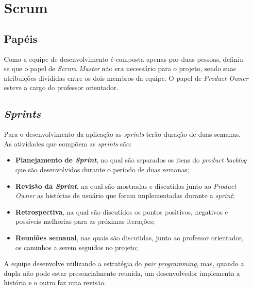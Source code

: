 \section{Scrum}

\subsection{Papéis}
Como a equipe de desenvolvimento é composta apenas por duas pessoas, definiu-se que o papel de \textit{Scrum Master} não era necessário para o projeto, sendo suas atribuições divididas entre os dois membros da equipe. O papel de \textit{Product Owner} esteve a cargo do professor orientador.

\subsection{\textit{Sprints}}
Para o desenvolvimento da aplicação as \textit{sprints} terão duração de duas semanas. As atividades que compõem as \textit{sprints} são:
\begin{itemize}
  \item \textbf{Planejamento de \textit{Sprint}}, no qual são separados os itens do \textit{product backlog} que são desenvolvidos durante o período de duas semanas;
  \item \textbf{Revisão da \textit{Sprint}}, na qual são mostradas e discutidas junto ao \textit{Product Owner} as histórias de usuário que foram implementadas durante a \textit{sprint};
  \item \textbf{Retrospectiva}, na qual são discutidos os pontos positivos, negativos e possíveis melhorias para as próximas iterações;
  \item \textbf{Reuniões semanal}, nas quais são discutidas, junto ao professor orientador, os caminhos a serem seguidos no projeto;
\end{itemize}
A equipe desenvolve utilizando a estratégia do \textit{pair programming}, mas, quando a dupla não pode estar presencialmente reunida, um desenvolvedor implementa a história e o outro faz uma revisão.

